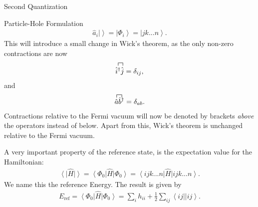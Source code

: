 \documentclass[twoside,english]{uiofysmaster}
\begin{document}
\begin{chapter}{Second Quantization}
\begin{section}{Particle-Hole Formulation}
		\begin{align}
			\hat a_i \left| \right> = \left| \Phi_i \right> = \left| jk ... n \right>.
		\end{align}
		This will introduce a small change in Wick's theorem, as the only non-zero contractions are now 
		\begin{align}
			\contraction{}{\hat i^\dagger}{}{\hat j}
			\hat i^\dagger \hat j = \delta_{ij},
		\end{align}
		and 
		\begin{align}
			\contraction{}{\hat a}{}{\hat b^\dagger}
			\hat a \hat b^\dagger = \delta_{ab}.
		\end{align}
		Contractions relative to the Fermi vacuum will now be denoted by brackets \textit{above} the operators instead of below. Apart from this, Wick's theorem is unchanged relative to the Fermi vacuum. \par 

		A very important property of the reference state, is the expectation value for the Hamiltonian: 
		\begin{align}
			\left< \right| \hat H \left| \right> = \left< \Phi_0 \right| \hat H \left| \Phi_0 \right> = \left< ijk...n \right| \hat H \left| ijk...n\right> .
		\end{align}
		We name this the reference Energy. The result is given by \cite{ShavittAndBartlett}
		\begin{align}
			E_{\text{ref}} = \left< \Phi_0 \right| \hat H \left| \Phi_0 \right> = \sum_i h_{ii} + \frac{1}{2} \sum_{ij} \left< ij || ij \right>.
		\end{align}

	\end{section}


\end{chapter}
\end{document}
